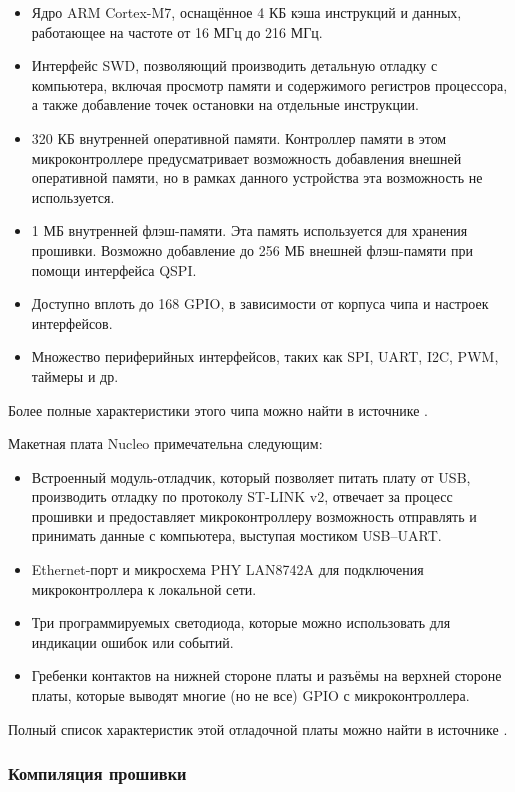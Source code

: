 \documentclass[rusmathsym, eqnumwithinsec, amspack, hyperref]{bomgost}
\begin{document}
\begin{itemize}
	\item Ядро ARM Cortex-M7, оснащённое 4 КБ кэша инструкций и данных, работающее на частоте от 16 МГц до 216 МГц.
	\item Интерфейс SWD, позволяющий производить детальную отладку с компьютера, включая просмотр памяти и содержимого регистров процессора, а также добавление точек остановки на отдельные инструкции.
	\item 320 КБ внутренней оперативной памяти. Контроллер памяти в этом микроконтроллере предусматривает возможность добавления внешней оперативной памяти, но в рамках данного устройства эта возможность не используется.
	\item 1 МБ внутренней флэш-памяти. Эта память используется для хранения прошивки. Возможно добавление до 256 МБ внешней флэш-памяти при помощи интерфейса QSPI.
	\item Доступно вплоть до 168 GPIO, в зависимости от корпуса чипа и настроек интерфейсов.
	\item Множество периферийных интерфейсов, таких как SPI, UART, I2C, PWM, таймеры и др.
\end{itemize}

Более полные характеристики этого чипа можно найти в источнике \cite{STM32F746Datasheet}.

Макетная плата Nucleo примечательна следующим:

\begin{itemize}
	\item Встроенный модуль-отладчик, который позволяет питать плату от USB, производить отладку по протоколу ST-LINK v2, отвечает за процесс прошивки и предоставляет микроконтроллеру возможность отправлять и принимать данные с компьютера, выступая мостиком USB--UART.
	\item Ethernet-порт и микросхема PHY LAN8742A для подключения микроконтроллера к локальной сети.
	\item Три программируемых светодиода, которые можно использовать для индикации ошибок или событий.
	\item Гребенки контактов на нижней стороне платы и разъёмы на верхней стороне платы, которые выводят многие (но не все) GPIO с микроконтроллера.
\end{itemize}

Полный список характеристик этой отладочной платы можно найти в источнике \cite{NucleoDatasheet}.

\subsubsection{Компиляция прошивки}
\end{document}
